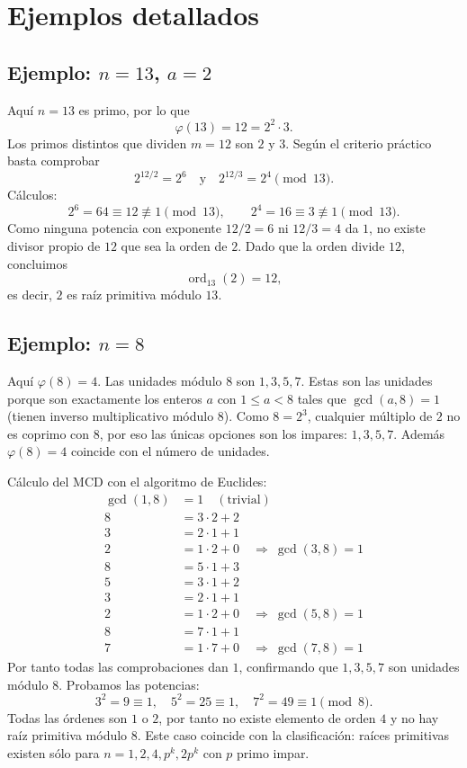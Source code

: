 \documentclass[12pt]{article}
\begin{document}
\section{Ejemplos detallados}
\subsection{Ejemplo: $n=13$, $a=2$}
Aquí $n=13$ es primo, por lo que
\[\varphi(13)=12=2^2\cdot3.\]
Los primos distintos que dividen $m=12$ son $2$ y $3$. Según el criterio práctico basta comprobar
\[2^{12/2}=2^6\quad\text{y}\quad 2^{12/3}=2^4\pmod{13}.\]
Cálculos:
\[2^6=64\equiv12\not\equiv1\pmod{13},\qquad 2^4=16\equiv3\not\equiv1\pmod{13}.\]
Como ninguna potencia con exponente $12/2=6$ ni $12/3=4$ da $1$, no existe divisor propio de $12$ que sea la orden de $2$. Dado que la orden divide $12$, concluimos
\[\operatorname{ord}_{13}(2)=12,\]
es decir, $2$ es raíz primitiva módulo $13$.

\subsection{Ejemplo: $n=8$}
Aquí $\varphi(8)=4$. Las unidades módulo 8 son $1,3,5,7$. 
Estas son las unidades porque son exactamente los enteros $a$ con $1\le a<8$ tales que $\gcd(a,8)=1$ (tienen inverso multiplicativo módulo $8$). Como $8=2^3$, cualquier múltiplo de $2$ no es coprimo con $8$, por eso las únicas opciones son los impares: $1,3,5,7$. Además $\varphi(8)=4$ coincide con el número de unidades.

Cálculo del MCD con el algoritmo de Euclides:
\[
\begin{aligned}
\gcd(1,8)&=1\quad(\text{trivial})\\[4pt]
8&=3\cdot2+2\\
3&=2\cdot1+1\\
2&=1\cdot2+0\quad\Rightarrow\ \gcd(3,8)=1\\[6pt]
8&=5\cdot1+3\\
5&=3\cdot1+2\\
3&=2\cdot1+1\\
2&=1\cdot2+0\quad\Rightarrow\ \gcd(5,8)=1\\[6pt]
8&=7\cdot1+1\\
7&=1\cdot7+0\quad\Rightarrow\ \gcd(7,8)=1
\end{aligned}
\]
Por tanto todas las comprobaciones dan $1$, confirmando que $1,3,5,7$ son unidades módulo $8$.
Probamos las potencias:
\[3^2=9\equiv1,\quad 5^2=25\equiv1,\quad 7^2=49\equiv1\pmod8.\]
Todas las órdenes son $1$ o $2$, por tanto no existe elemento de orden $4$ y no hay raíz primitiva módulo $8$. Este caso coincide con la clasificación: raíces primitivas existen sólo para $n=1,2,4,p^k,2p^k$ con $p$ primo impar.
\end{document}
